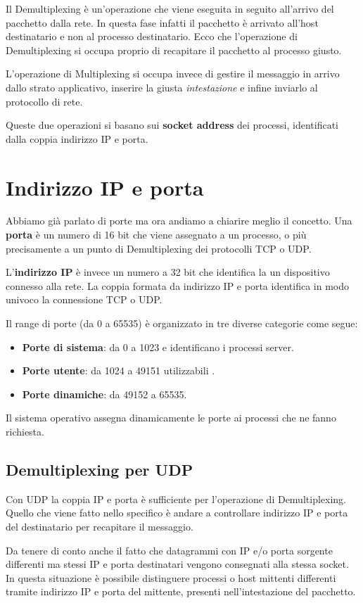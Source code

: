Il Demultiplexing è un'operazione che viene eseguita in seguito 
all'arrivo del pacchetto dalla rete. In questa fase infatti il 
pacchetto è arrivato all'host destinatario e non al processo 
destinatario. Ecco che l'operazione di Demultiplexing si occupa proprio
di recapitare il pacchetto al processo giusto.

L'operazione di Multiplexing si occupa invece di gestire il messaggio 
in arrivo dallo strato applicativo, inserire la giusta 
\emph{intestazione} e infine inviarlo al protocollo di rete.

Queste due operazioni si basano sui \textbf{socket address} dei 
processi, identificati dalla coppia indirizzo IP e porta.

\section{Indirizzo IP e porta}
Abbiamo già parlato di porte ma ora andiamo a chiarire meglio il 
concetto. Una \textbf{porta} è un numero di 16 bit che viene assegnato 
a un processo, o più precisamente a un punto di Demultiplexing dei 
protocolli TCP o UDP.

L'\textbf{indirizzo IP} è invece un numero a 32 bit che identifica la
un dispositivo connesso alla rete. La coppia formata da indirizzo IP 
e porta identifica in modo univoco la connessione TCP o UDP.

Il range di porte (da 0 a 65535) è organizzato in tre diverse categorie
come segue:
\begin{itemize}
	\item \textbf{Porte di sistema}: da 0 a 1023 e identificano i 
		processi server.
	\item \textbf{Porte utente}: da 1024 a 49151 utilizzabili .
	\item \textbf{Porte dinamiche}: da 49152 a 65535.
\end{itemize}
Il sistema operativo assegna dinamicamente le porte ai processi che ne 
fanno richiesta.

\subsection{Demultiplexing per UDP}
Con UDP la coppia IP e porta è sufficiente per l'operazione di 
Demultiplexing. Quello che viene fatto nello specifico è andare a 
controllare indirizzo IP e porta del destinatario per recapitare il 
messaggio.

Da tenere di conto anche il fatto che datagrammi con IP e/o porta 
sorgente differenti ma stessi IP e porta destinatari vengono 
consegnati alla stessa socket. In questa situazione è possibile
distinguere processi o host mittenti differenti tramite indirizzo IP 
e porta del mittente, presenti nell'intestazione del pacchetto.

